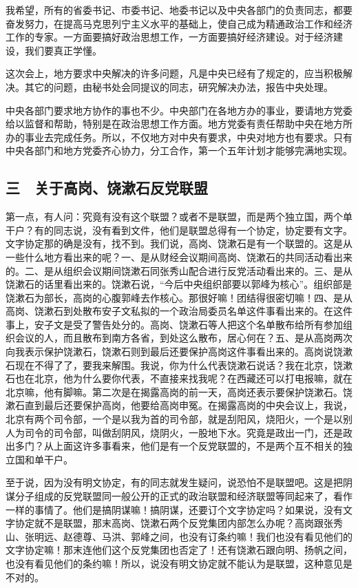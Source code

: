 我希望，所有的省委书记、市委书记、地委书记以及中央各部门的负责同志，都要奋发努力，在提高马克思列宁主义水平的基础上，使自己成为精通政治工作和经济工作的专家。一方面要搞好政治思想工作，一方面要搞好经济建设。对于经济建设，我们要真正学懂。

这次会上，地方要求中央解决的许多问题，凡是中央已经有了规定的，应当积极解决。其它的问题，由秘书处会同提议的同志，研究解决办法，报告中央处理。

中央各部门要求地方协作的事也不少。中央部门在各地方办的事业，要请地方党委给以监督和帮助，特别是在政治思想工作方面。地方党委有责任帮助中央在地方所办的事业去完成任务。所以，不仅地方对中央有要求，中央对地方也有要求。只有中央各部门和地方党委齐心协力，分工合作，第一个五年计划才能够完满地实现。

\subsection{三　关于高岗、饶漱石反党联盟}

第一点，有人问：究竟有没有这个联盟？或者不是联盟，而是两个独立国，两个单干户？有的同志说，没有看到文件，他们是联盟总得有一个协定，协定要有文字。文字协定那的确是没有，找不到。我们说，高岗、饶漱石是有一个联盟的。这是从一些什么地方看出来的呢？一、是从财经会议期间高岗、饶漱石的共同活动看出来的。二、是从组织会议期间饶漱石同张秀山配合进行反党活动看出来的。三、是从饶漱石的话里看出来的。饶漱石说，“今后中央组织部要以郭峰为核心”。组织部是饶漱石为部长，高岗的心腹郭峰去作核心。那很好嘛！团结得很密切嘛！四、是从高岗、饶漱石到处散布安子文私拟的一个政治局委员名单这件事看出来的。在这件事上，安子文是受了警告处分的。高岗、饶漱石等人把这个名单散布给所有参加组织会议的人，而且散布到南方各省，到处这么散布，居心何在？五、是从高岗两次向我表示保护饶漱石，饶漱石则到最后还要保护高岗这件事看出来的。高岗说饶漱石现在不得了了，要我来解围。我说，你为什么代表饶漱石说话？我在北京，饶漱石也在北京，他为什么要你代表，不直接来找我呢？在西藏还可以打电报嘛，就在北京嘛，他有脚嘛。第二次是在揭露高岗的前一天，高岗还表示要保护饶漱石。饶漱石直到最后还要保护高岗，他要给高岗申冤。在揭露高岗的中央会议上，我说，北京有两个司令部，一个是以我为首的司令部，就是刮阳风，烧阳火，一个是以别人为司令的司令部，叫做刮阴风，烧阴火，一股地下水。究竟是政出一门，还是政出多门？从上面这许多事看来，他们是有一个反党联盟的，不是两个互不相关的独立国和单干户。

至于说，因为没有明文协定，有的同志就发生疑问，说恐怕不是联盟吧。这是把阴谋分子组成的反党联盟同一般公开的正式的政治联盟和经济联盟等同起来了，看作一样的事情了。他们是搞阴谋嘛！搞阴谋，还要订个文字协定吗？如果说，没有文字协定就不是联盟，那末高岗、饶漱石两个反党集团内部怎么办呢？高岗跟张秀山、张明远、赵德尊、马洪、郭峰之间，也没有订条约嘛！我们也没有看见他们的文字协定嘛！那末连他们这个反党集团也否定了！还有饶漱石跟向明、扬帆之间，也没有看见他们的条约嘛！所以，说没有明文协定就不能认为是联盟，这种意见是不对的。

